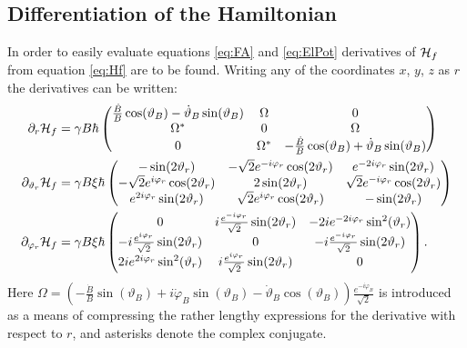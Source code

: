 \documentclass[a4paper]{article}
\begin{document}
\subsection{Differentiation of the Hamiltonian}\label{sec:Hdiff}
In order to easily evaluate equations \ref{eq:FA} and \ref{eq:ElPot} derivatives of
\(\mathbb{\cal H}_f\) from equation \ref{eq:Hf} are to be found. Writing any of the coordinates \(x\), \(y\), \(z\)
as \(r\) the derivatives can
be written:
\begin{align}\label{eq:diffham1}
        \partial_r\mathbb{\cal H}_f  &= \gamma B \hbar{} \pmqty{
 \frac{\dot B}{B}\cos(\vartheta_B) -\dot \vartheta_B \sin(\vartheta_B) & \Omega & 0 \\
 \Omega^{*} & 0 & \Omega\\
 0 & \Omega^{*}& -\frac{\dot B}{B}\cos(\vartheta_B) + \dot \vartheta_B \sin(\vartheta_B)
        }\\
        \label{eq:diffham2}
        \partial_{\vartheta_r} \mathbb{\cal H}_f &= \gamma B \xi \hbar{}\pmqty{
                -\sin(2\vartheta_r) & -\sqrt{2}  e^{-i\varphi_r}\cos(2\vartheta_r) &
                 e^{-2i\varphi_r}\sin(2\vartheta_r)\\
                -\sqrt{2}  e^{i\varphi_r}\cos(2\vartheta_r) & 2\sin(2\vartheta_r) &
                \sqrt{2} e^{-i\varphi_r}\cos(2\vartheta_r)\\
                 e^{2i\varphi_r}\sin(2\vartheta_r) & \sqrt{2} 
                e^{i\varphi_r}\cos(2\vartheta_r) & -\sin(2\vartheta_r)
        }\\
        \label{eq:diffham3}
        \partial_{\varphi_r} \mathbb{\cal H}_f &= \gamma B \xi \hbar{}\pmqty{
                0 & i  \frac{e^{-i\varphi_r}}{\sqrt{2} }\sin(2\vartheta_r) &
                -2i e^{-2i\varphi_r}\sin[2](\vartheta_r)\\
                -i  \frac{e^{i\varphi_r}}{\sqrt{2} }\sin(2\vartheta_r) & 0 & -i 
                \frac{e^{-i\varphi_r}}{\sqrt{2} }\sin(2\vartheta_r) \\
                2i e^{2i\varphi_r}\sin[2](\vartheta_r) & i \frac{e^{i\varphi_r}}{\sqrt{2}
                }\sin(2\vartheta_r) & 0
        }
.\end{align}
Here \(\Omega = (-\frac{\dot B}{B}\sin(\vartheta_B) + i\dot \varphi_B 
 \sin(\vartheta_B) -\dot \vartheta_B \cos(\vartheta_B)) \frac{e^{-i\varphi_B}}{\sqrt{2}}\) is introduced as a means of compressing the
rather lengthy expressions for the derivative with respect to \(r\), and asterisks denote
the complex conjugate.
\end{document}
